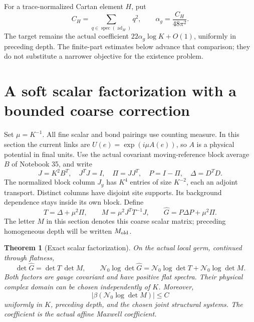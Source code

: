 \documentclass[11pt]{article}
\newtheorem{theorem}{Theorem}[section]
\theoremstyle{remark}
\begin{document}
For a trace-normalized Cartan element \(H\), put
\[
 C_H=\sum_{q\in\operatorname{spec}(\operatorname{ad}_H)}q^2,
 \qquad \alpha_g=\frac{C_H}{48\pi^2}.
\]
The target remains the actual coefficient
\(22\alpha_g\log K+O(1)\), uniformly in preceding depth.
The finite-part estimates below advance that comparison; they do not
substitute a narrower objective for the existence problem.



\section{A soft scalar factorization with a bounded coarse correction}
\label{ssc-section}

Set \(\mu=K^{-1}\). All fine scalar and bond pairings use counting
measure. In this section the current links are
\(U(e)=\exp(i\mu A(e))\), so \(A\) is a physical potential in final
units. Use the actual covariant moving-reference block average \(B\)
of Notebook 35, and write
\begin{equation}
 J=K^2B^T,\quad J^TJ=I,\quad \Pi=JJ^T,\quad P=I-\Pi,
 \quad \Delta=D^TD.
 \label{ssc-data}
\end{equation}
The normalized block column \(J_y\) has \(K^4\) entries of size
\(K^{-2}\), each an adjoint transport. Distinct columns have disjoint
site supports. Its background dependence stays inside its own block.
Define
\begin{equation}
 T=\Delta+\mu^2\Pi,\qquad
 M=\mu^2J^TT^{-1}J,\qquad
 \widehat G=P\Delta P+\mu^2\Pi .
 \label{ssc-soft}
\end{equation}
The letter \(M\) in this section denotes this coarse scalar matrix;
preceding homogeneous depth will be written \(M_{\rm old}\).

\begin{theorem}[Exact scalar factorization]
\label{ssc-factorization}
On the actual local germ, continued through flatness,
\begin{equation}
 \det\widehat G=\det T\,\det M,\qquad
 \mathcal N_0\log\det\widehat G
   =\mathcal N_0\log\det T+\mathcal N_0\log\det M .
 \label{ssc-determinant}
\end{equation}
Both factors are gauge covariant and have positive flat spectra.
Their physical complex domain can be chosen independently of \(K\).
Moreover,
\begin{equation}
 \left|\beta(\mathcal N_0\log\det M)\right|\le C
 \label{ssc-coarse-bound}
\end{equation}
uniformly in \(K\), preceding depth, and the chosen joint structural
systems. The coefficient is the actual affine Maxwell coefficient.
\end{theorem}
\end{document}
